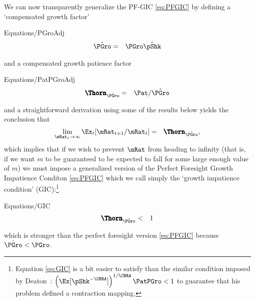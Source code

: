 \documentclass[titlepage]{\econtex}\providecommand{\texname}{BufferStockTheory}
\providecommand{\EqDir}{Equations}
\begin{document}
\hypertarget{GIC}{}
We can now transparently generalize the PF-GIC \eqref{eq:PFGIC} by defining a `compensated growth factor'
\begin{verbatimwrite}{\EqDir/PGroAdj}
\begin{eqnarray}
  \PGroAdj & = &  \PGro \InvEpShkInv \label{eq:PGroAdj}
\end{eqnarray}
\end{verbatimwrite}

and a compensated growth patience factor\hypertarget{GIF}{}
\begin{verbatimwrite}{\EqDir/PatPGroAdj}
\begin{eqnarray}
  \PatPGroAdj & = & \Pat/\PGroAdj
\end{eqnarray}
\end{verbatimwrite}

and a straightforward derivation
using some of the results below yields the conclusion that
\begin{eqnarray*}
  \lim_{\mRat_{t} \rightarrow \infty} \Ex_{t}[\mRat_{t+1}/\mRat_{t}] & = & \PatPGroAdj,
\end{eqnarray*}
which implies that if we wish to prevent $\mRat$ from heading to infinity (that is, if we want $m$ to be guaranteed to be expected to fall for some large enough value of $m$) we must impose a generalized version of the Perfect Foresight Growth Impatience Conditon \eqref{eq:PFGIC} which we call simply the `growth impatience condition' 
(GIC):\footnote{Equation \eqref{eq:GIC} is a bit easier to satisfy than the similar condition imposed by Deaton~\citeyearpar{deatonLiqConstr}: $\left(\Ex[\pShk^{-\CRRA}]\right)^{1/\CRRA} \PatPGro < 1$ to guarantee that his problem defined a contraction mapping.}
\begin{verbatimwrite}{\EqDir/GIC}
\begin{eqnarray}
  \PatPGroAdj & < & 1 \label{eq:GIC}
\end{eqnarray}\end{verbatimwrite}

which is stronger than the perfect foresight version \eqref{eq:PFGIC} because $\PGroAdj < \PGro$.

\hypertarget{Autarky-Value}{}
\end{document}
